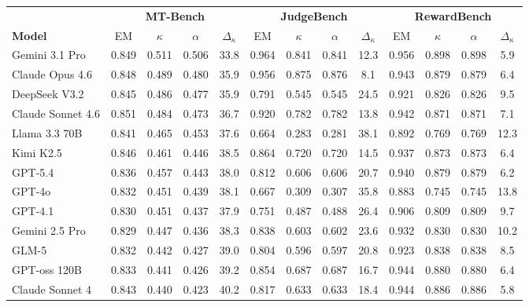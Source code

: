 \begin{table}[!t]
\centering
\small
\setlength{\tabcolsep}{3.5pt}
\begin{tabular}{lcccccccccccc}
\toprule
& \multicolumn{4}{c}{\textbf{MT-Bench}} & \multicolumn{4}{c}{\textbf{JudgeBench}} & \multicolumn{4}{c}{\textbf{RewardBench}} \\
\cmidrule(lr){2-5}\cmidrule(lr){6-9}\cmidrule(lr){10-13}
\textbf{Model} & EM & $\kappa$ & $\alpha$ & $\Delta_\kappa$ & EM & $\kappa$ & $\alpha$ & $\Delta_\kappa$ & EM & $\kappa$ & $\alpha$ & $\Delta_\kappa$ \\
\midrule
Gemini 3.1 Pro    & 0.849 & 0.511 & 0.506 & 33.8 & 0.964 & 0.841 & 0.841 & 12.3 & 0.956 & 0.898 & 0.898 &  5.9 \\
Claude Opus 4.6   & 0.848 & 0.489 & 0.480 & 35.9 & 0.956 & 0.875 & 0.876 &  8.1 & 0.943 & 0.879 & 0.879 &  6.4 \\
DeepSeek V3.2     & 0.845 & 0.486 & 0.477 & 35.9 & 0.791 & 0.545 & 0.545 & 24.5 & 0.921 & 0.826 & 0.826 &  9.5 \\
Claude Sonnet 4.6 & 0.851 & 0.484 & 0.473 & 36.7 & 0.920 & 0.782 & 0.782 & 13.8 & 0.942 & 0.871 & 0.871 &  7.1 \\
Llama 3.3 70B     & 0.841 & 0.465 & 0.453 & 37.6 & 0.664 & 0.283 & 0.281 & 38.1 & 0.892 & 0.769 & 0.769 & 12.3 \\
Kimi K2.5         & 0.846 & 0.461 & 0.446 & 38.5 & 0.864 & 0.720 & 0.720 & 14.5 & 0.937 & 0.873 & 0.873 &  6.4 \\
GPT-5.4           & 0.836 & 0.457 & 0.443 & 38.0 & 0.812 & 0.606 & 0.606 & 20.7 & 0.940 & 0.879 & 0.879 &  6.2 \\
GPT-4o            & 0.832 & 0.451 & 0.439 & 38.1 & 0.667 & 0.309 & 0.307 & 35.8 & 0.883 & 0.745 & 0.745 & 13.8 \\
GPT-4.1           & 0.830 & 0.451 & 0.437 & 37.9 & 0.751 & 0.487 & 0.488 & 26.4 & 0.906 & 0.809 & 0.809 &  9.7 \\
Gemini 2.5 Pro    & 0.829 & 0.447 & 0.436 & 38.3 & 0.838 & 0.603 & 0.602 & 23.6 & 0.932 & 0.830 & 0.830 & 10.2 \\
GLM-5             & 0.832 & 0.442 & 0.427 & 39.0 & 0.804 & 0.596 & 0.597 & 20.8 & 0.923 & 0.838 & 0.838 &  8.5 \\
GPT-oss 120B      & 0.833 & 0.441 & 0.426 & 39.2 & 0.854 & 0.687 & 0.687 & 16.7 & 0.944 & 0.880 & 0.880 &  6.4 \\
Claude Sonnet 4   & 0.843 & 0.440 & 0.423 & 40.2 & 0.817 & 0.633 & 0.633 & 18.4 & 0.944 & 0.886 & 0.886 &  5.8 \\

\end{tabular}
\end{table}
